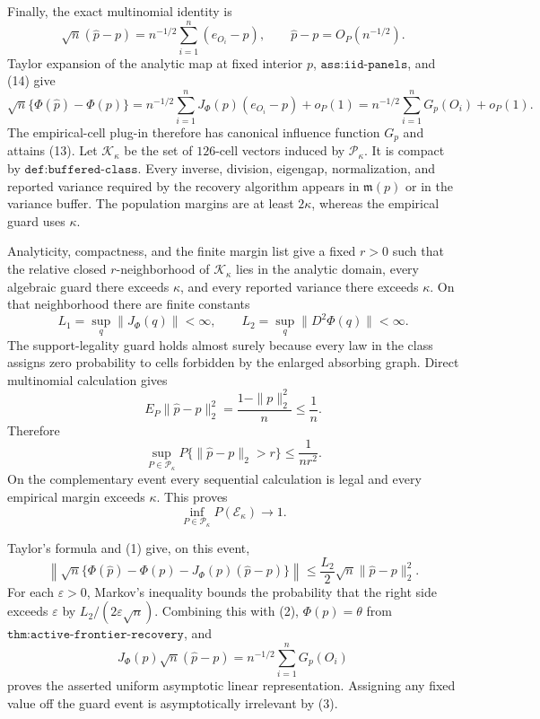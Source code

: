 Finally, the exact multinomial identity is
\[
 \sqrt n(\widehat p-p)=n^{-1/2}\sum_{i=1}^n(e_{O_i}-p),
 \qquad \widehat p-p=O_P(n^{-1/2}).                         \tag{14}
\]
Taylor expansion of the analytic map at fixed interior \(p\), \(\texttt{ass:iid-panels}\), and (14) give
\[
 \sqrt n\{\Phi(\widehat p)-\Phi(p)\}
 =n^{-1/2}\sum_{i=1}^nJ_{\Phi}(p)(e_{O_i}-p)+o_P(1)
 =n^{-1/2}\sum_{i=1}^nG_p(O_i)+o_P(1).                     \tag{15}
\]
The empirical-cell plug-in therefore has canonical influence function \(G_p\) and attains (13).
Let \(\mathcal K_\kappa\) be the set of \(126\)-cell vectors induced by \(\mathcal P_\kappa\).  It is compact by \(\texttt{def:buffered-class}\).  Every inverse, division, eigengap, normalization, and reported variance required by the recovery algorithm appears in \(\mathfrak m(p)\) or in the variance buffer.  The population margins are at least \(2\kappa\), whereas the empirical guard uses \(\kappa\).

Analyticity, compactness, and the finite margin list give a fixed \(r>0\) such that the relative closed \(r\)-neighborhood of \(\mathcal K_\kappa\) lies in the analytic domain, every algebraic guard there exceeds \(\kappa\), and every reported variance there exceeds \(\kappa\).  On that neighborhood there are finite constants
\[
 L_1=\sup_q\|J_{\Phi}(q)\|<\infty,
 \qquad L_2=\sup_q\|D^2\Phi(q)\|<\infty.                 \tag{1}
\]
The support-legality guard holds almost surely because every law in the class assigns zero probability to cells forbidden by the enlarged absorbing graph.  Direct multinomial calculation gives
\[
 E_P\|\widehat p-p\|_2^2
 =\frac{1-\|p\|_2^2}{n}\leq\frac1n.
\]
Therefore
\[
 \sup_{P\in\mathcal P_\kappa}P\{\|\widehat p-p\|_2>r\}
 \leq\frac1{nr^2}.                                         \tag{2}
\]
On the complementary event every sequential calculation is legal and every empirical margin exceeds \(\kappa\).  This proves
\[
 \inf_{P\in\mathcal P_\kappa}P(\mathcal E_\kappa)\longrightarrow1.                           \tag{3}
\]

Taylor's formula and (1) give, on this event,
\[
 \left\|\sqrt n\{\Phi(\widehat p)-\Phi(p)-J_{\Phi}(p)(\widehat p-p)\}\right\|
 \leq\frac{L_2}{2}\sqrt n\|\widehat p-p\|_2^2.           \tag{4}
\]
For each \(\varepsilon>0\), Markov's inequality bounds the probability that the right side exceeds \(\varepsilon\) by \(L_2/(2\varepsilon\sqrt n)\).  Combining this with (2), \(\Phi(p)=\theta\) from \(\texttt{thm:active-frontier-recovery}\), and
\[
 J_{\Phi}(p)\sqrt n(\widehat p-p)
 =n^{-1/2}\sum_{i=1}^nG_p(O_i)
\]
proves the asserted uniform asymptotic linear representation.  Assigning any fixed value off the guard event is asymptotically irrelevant by (3).


